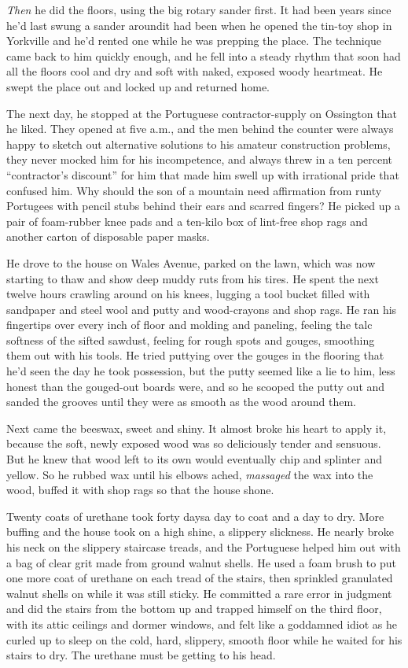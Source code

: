 \textit{Then} he did the floors, using the big rotary sander first. 
It had been years since he'd last swung a sander around\dash{}it had been
when he opened the tin-toy shop in Yorkville and he'd rented one while
he was prepping the place.  The technique came back to him quickly
enough, and he fell into a steady rhythm that soon had all the floors
cool and dry and soft with naked, exposed woody heartmeat.  He swept
the place out and locked up and returned home.

The next day, he stopped at the Portuguese contractor-supply on
Ossington that he liked.  They opened at five a.m., and the men behind
the counter were always happy to sketch out alternative solutions to
his amateur construction problems, they never mocked him for his
incompetence, and always threw in a ten percent ``contractor's
discount'' for him that made him swell up with irrational pride that
confused him.  Why should the son of a mountain need affirmation from
runty Portugees with pencil stubs behind their ears and scarred
fingers?  He picked up a pair of foam-rubber knee pads and a ten-kilo
box of lint-free shop rags and another carton of disposable paper
masks.

He drove to the house on Wales Avenue, parked on the lawn, which was
now starting to thaw and show deep muddy ruts from his tires.  He
spent the next twelve hours crawling around on his knees, lugging a
tool bucket filled with sandpaper and steel wool and putty and
wood-crayons and shop rags.  He ran his fingertips over every inch of
floor and molding and paneling, feeling the talc softness of the
sifted sawdust, feeling for rough spots and gouges, smoothing them out
with his tools.  He tried puttying over the gouges in the flooring
that he'd seen the day he took possession, but the putty seemed like a
lie to him, less honest than the gouged-out boards were, and so he
scooped the putty out and sanded the grooves until they were as smooth
as the wood around them.

Next came the beeswax, sweet and shiny.  It almost broke his heart to
apply it, because the soft, newly exposed wood was so deliciously
tender and sensuous.  But he knew that wood left to its own would
eventually chip and splinter and yellow.  So he rubbed wax until his
elbows ached, \textit{massaged} the wax into the wood, buffed it with
shop rags so that the house shone.

Twenty coats of urethane took forty days\dash{}a day to coat and a day to
dry.  More buffing and the house took on a high shine, a slippery
slickness.  He nearly broke his neck on the slippery staircase treads,
and the Portuguese helped him out with a bag of clear grit made from
ground walnut shells.  He used a foam brush to put one more coat of
urethane on each tread of the stairs, then sprinkled granulated walnut
shells on while it was still sticky.  He committed a rare error in
judgment and did the stairs from the bottom up and trapped himself on
the third floor, with its attic ceilings and dormer windows, and felt
like a goddamned idiot as he curled up to sleep on the cold, hard,
slippery, smooth floor while he waited for his stairs to dry.  The
urethane must be getting to his head.

